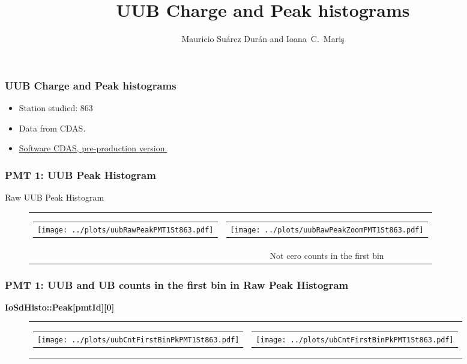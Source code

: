 \documentclass[aspectratio=169]{beamer}
\title{UUB Charge and Peak histograms}
\author{
  Mauricio Su\'arez Dur\'an and Ioana~C.~Mari\c{s}
}
\institute{IIHE-ULB}
\begin{document}
\begin{frame}
  \titlepage
\end{frame}


\begin{frame}
	\frametitle{UUB Charge and Peak histograms}
  \begin{itemize}
		\item Station studied: 863
    \item Data from CDAS.
		\item {\underline {Software CDAS, pre-production version.}}
	\end{itemize}
\end{frame}



\begin{frame}
	\frametitle{PMT 1: UUB Peak Histogram}
	Raw UUB Peak Histogram
	\begin{figure}
		\centering
		\begin{tabularx}{\textwidth}{CC}
			\begin{tabular}{l}
				\texttt{[image: ../plots/uubRawPeakPMT1St863.pdf]}
			\end{tabular}
			&
			\begin{tabular}{l}
				\texttt{[image: ../plots/uubRawPeakZoomPMT1St863.pdf]}
			\end{tabular}
			\\
			& Not cero counts in the first bin
		\end{tabularx}
	\end{figure}
\end{frame}



\begin{frame}
	\frametitle{PMT 1: UUB and UB counts in the first bin in Raw Peak Histogram}
	{\bf IoSdHisto::Peak[pmtId][0]}
	\begin{figure}
		\centering
		\begin{tabularx}{\textwidth}{CC}
			\begin{tabular}{l}
				\texttt{[image: ../plots/uubCntFirstBinPkPMT1St863.pdf]}
			\end{tabular}
			&
			\begin{tabular}{l}
				\texttt{[image: ../plots/ubCntFirstBinPkPMT1St863.pdf]}
			\end{tabular}
		\end{tabularx}
	\end{figure}
\end{frame}
\end{document}
